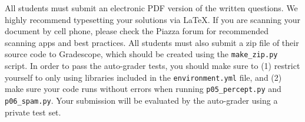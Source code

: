All students must submit an electronic PDF version of the written questions. We
highly recommend typesetting your solutions via \LaTeX. If you are scanning
your document by cell phone, please check the Piazza forum for recommended
scanning apps and best practices. All students must also submit a zip file of
their source code to Gradescope, which should be created using the
\texttt{make\_zip.py} script. In order to pass the auto-grader tests, you
should make sure to (1) restrict yourself to only using libraries included in
the \texttt{environment.yml} file, and (2) make sure your code runs without
errors when running \texttt{p05\_percept.py} and \texttt{p06\_spam.py}.  Your submission will be evaluated by
the auto-grader using a private test set.

